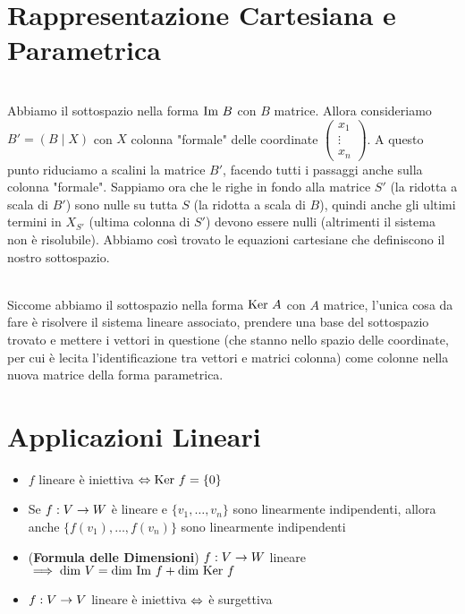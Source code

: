 \documentclass[a4paper,NoNotes,GeneralMath]{stdmdoc}
\begin{document}
	\section*{Rappresentazione Cartesiana e Parametrica}
	 \\
	Abbiamo il sottospazio nella forma $\mbox{Im } B$ con $B$ matrice. Allora consideriamo $B' = \left( B \mid X \right)$ con $X$ colonna "formale" delle coordinate $\left( \begin{array}{c} x_1 \\ \vdots \\ x_n \end{array} \right)$. A questo punto riduciamo a scalini la matrice $B'$, facendo tutti i passaggi anche sulla colonna "formale". Sappiamo ora che le righe in fondo alla matrice $S'$ (la ridotta a scala di $B'$) sono nulle su tutta $S$ (la ridotta a scala di $B$), quindi anche gli ultimi termini in $X_{S'}$ (ultima colonna di $S'$) devono essere nulli (altrimenti il sistema non è risolubile). Abbiamo così trovato le equazioni cartesiane che definiscono il nostro sottospazio.

	 \\
	Siccome abbiamo il sottospazio nella forma $\mbox{Ker } A$ con $A$ matrice, l'unica cosa da fare è risolvere il sistema lineare associato, prendere una base del sottospazio trovato e mettere i vettori in questione (che stanno nello spazio delle coordinate, per cui è lecita l'identificazione tra vettori e matrici colonna) come colonne nella nuova matrice della forma parametrica.

	\section*{Applicazioni Lineari}
	\begin{itemize}
		\item $f$ lineare è iniettiva $\Leftrightarrow \mbox{Ker } f = \{0\}$
		\item Se $f: V \rightarrow W$ è lineare e $\{v_1, \ldots, v_n\}$ sono linearmente indipendenti, allora anche $\{f(v_1), \ldots, f(v_n)\}$ sono linearmente indipendenti
		\item ({\bf Formula delle Dimensioni}) $f: V \rightarrow W$ lineare $\implies \mbox{dim } V = \mbox{dim } \mbox{Im } f + \mbox{dim } \mbox{Ker } f$
		\item $f: V \rightarrow V$ lineare è iniettiva $\Leftrightarrow$ è surgettiva
	\end{itemize}
\end{document}
